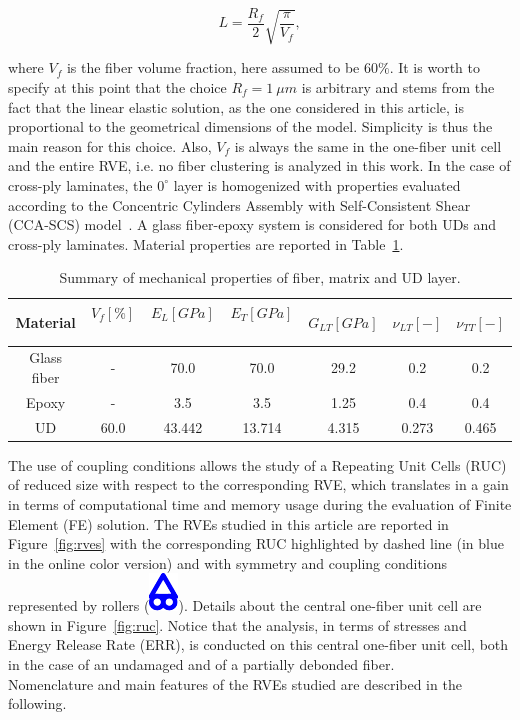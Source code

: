 \documentclass[12pt,a4paper]{article}
\begin{document}
\begin{equation}\label{eq:LVf}
L=\frac{R_{f}}{2}\sqrt{\frac{\pi}{V_{f}}},
\end{equation}

where $V_{f}$ is the fiber volume fraction, here assumed to be $60\%$. It is worth to specify at this point that the choice $R_{f}=1\ \mu m$ is arbitrary and stems from the fact that the linear elastic solution, as the one considered in this article, is proportional to the geometrical dimensions of the model. Simplicity is thus the main reason for this choice. Also, $V_{f}$ is always the same in the one-fiber unit cell and the entire RVE, i.e. no fiber clustering is analyzed in this work. In the case of cross-ply laminates, the $0^{\circ}$ layer is homogenized with properties evaluated according to the Concentric Cylinders Assembly with Self-Consistent Shear (CCA-SCS) model~\cite{Hashin1983,Christensen1979}. A glass fiber-epoxy system is considered for both UDs and cross-ply laminates. Material properties are reported in Table~\ref{tab:phaseprop}.

\begin{table}[!htbp]
 \centering
 \caption{Summary of mechanical properties of fiber, matrix and UD layer.}%
 \begin{tabular}{ccccccc}
\textbf{Material} & \textbf{$V_{f}\left[\%\right]$}\  & \textbf{$E_{L}\left[GPa\right]$}\ & \textbf{$E_{T}\left[GPa\right]$}\  & \textbf{$G_{LT}\left[GPa\right]$} &\textbf{$\nu_{LT}\left[-\right]$} & \textbf{$\nu_{TT}\left[-\right]$} \\
\midrule
Glass fiber &-   & 70.0 & 70.0  & 29.2 & 0.2  & 0.2\\
Epoxy    &-& 3.5 & 3.5   & 1.25 &  0.4& 0.4\\
UD&60.0&43.442&13.714& 4.315& 0.273&0.465\\
\end{tabular}
\label{tab:phaseprop}
\end{table}

The use of coupling conditions allows the study of a Repeating Unit Cells (RUC) of reduced size with respect to the corresponding RVE, which translates in a gain in terms of computational time and memory usage during the evaluation of Finite Element (FE) solution. The RVEs studied in this article are reported in Figure~\ref{fig:rves} with the corresponding RUC highlighted by dashed line (in blue in the online color version) and with symmetry and coupling conditions represented by rollers (\includegraphics[scale=0.5]{roller.pdf}). Details about the central one-fiber unit cell are shown in Figure~\ref{fig:ruc}. Notice that the analysis, in terms of stresses and Energy Release Rate (ERR), is conducted on this central one-fiber unit cell, both in the case of an undamaged and of a partially debonded fiber.\\
Nomenclature and main features of the RVEs studied are described in the following.
\end{document}
